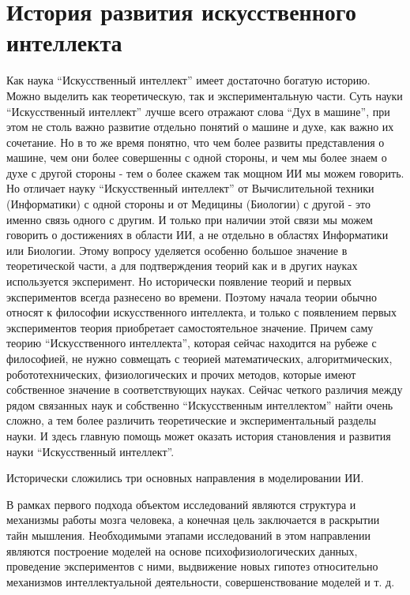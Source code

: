 \section{История развития искусственного интеллекта}

Как наука ``Искусственный интеллект'' имеет достаточно богатую историю. Можно выделить как теоретическую, так и экспериментальную части. Суть науки ``Искусственный интеллект'' лучше всего отражают слова ``Дух в машине'', при этом не столь важно развитие отдельно понятий о машине и духе, как важно их сочетание. Но в то же время понятно, что чем более развиты представления о машине, чем они более совершенны с одной стороны, и чем мы более знаем о духе с другой стороны - тем о более скажем так мощном ИИ мы можем говорить. Но отличает науку ``Искусственный интеллект'' от Вычислительной техники (Информатики) с одной стороны и от Медицины (Биологии) с другой - это именно связь одного с другим. И только при наличии этой связи мы можем говорить о достижениях в области ИИ, а не отдельно в областях Информатики или Биологии. Этому вопросу уделяется особенно большое значение в теоретической части, а для подтверждения теорий как и в других науках используется эксперимент. Но исторически появление теорий и первых экспериментов всегда разнесено во времени. Поэтому начала теории обычно относят к философии искусственного интеллекта, и только с появлением первых экспериментов теория приобретает самостоятельное значение. Причем саму теорию ``Искусственного интеллекта'', которая сейчас находится на рубеже с философией, не нужно совмещать с теорией математических, алгоритмических, робототехнических, физиологических и прочих методов, которые имеют собственное значение в соответствующих науках. Сейчас четкого различия между рядом связанных наук и собственно ``Искусственным интеллектом'' найти очень сложно, а тем более различить теоретические и экспериментальный разделы науки. И здесь главную помощь может оказать история становления и развития науки ``Искусственный интеллект''.

Исторически сложились три основных направления в моделировании ИИ.

В рамках первого подхода объектом исследований являются структура и механизмы работы мозга человека, а конечная цель заключается в раскрытии тайн мышления. Необходимыми этапами исследований в этом направлении являются построение моделей на основе психофизиологических данных, проведение экспериментов с ними, выдвижение новых гипотез относительно механизмов интеллектуальной деятельности, совершенствование моделей и т. д.

